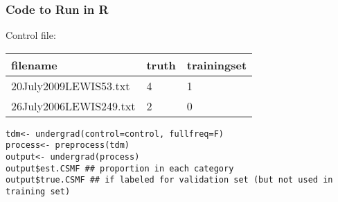 \documentclass{beamer}
\begin{document}
\begin{frame}
\frametitle{Code to Run in R}





Control file: \\
\begin{tabular}{lll} 
filename & truth & trainingset \\
\hline
20July2009LEWIS53.txt & 4 & \alert{1} \\
26July2006LEWIS249.txt & 2 & \alert{0} \\
\hline
\end{tabular} 



{\tt tdm<- undergrad(control=control, fullfreq=F)  } \\
{\tt process<- preprocess(tdm) } \\
{\tt output<- undergrad(process) } \\
{\tt output\$est.CSMF \#\# proportion in each category} \\
{\tt output\$true.CSMF \#\# if labeled for validation set (but not used in training set) } 



\end{frame}
\end{document}
